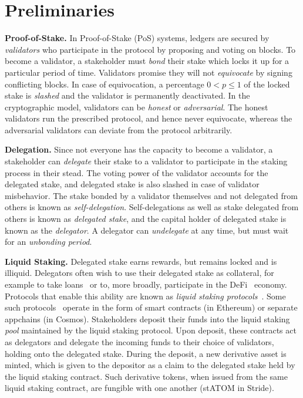 \section{Preliminaries}\label{sec:preliminaries}


\noindent
\textbf{Proof-of-Stake.} In Proof-of-Stake (PoS) systems, ledgers are secured
by \emph{validators} who participate in the protocol by proposing and voting
on blocks. To become a validator, a stakeholder must \emph{bond} their stake
which locks it up for a particular period of time. Validators promise they will
not \emph{equivocate} by signing conflicting blocks.
In case of equivocation, a percentage $0 < p \leq 1$ of the locked stake is
\emph{slashed} and the validator is permanently deactivated. In the cryptographic
model, validators can be \emph{honest} or \emph{adversarial}. The honest validators
run the prescribed protocol, and hence never equivocate, whereas the adversarial
validators can deviate from the protocol arbitrarily.


\noindent
\textbf{Delegation.} Since not everyone has the capacity to become a validator,
a stakeholder can \emph{delegate} their stake to a validator to participate in
the staking process in their stead. The voting power of the validator accounts
for the delegated stake, and delegated stake is also slashed in case of validator
misbehavior. The stake bonded by a validator themselves and not delegated from
others is known as \emph{self-delegation}. Self-delegations as
well as stake delegated from others is known as \emph{delegated stake},
and the capital holder of delegated stake is known as the \emph{delegator}.
A delegator can \emph{undelegate} at any time, but must wait for an
\emph{unbonding period}.

\noindent
\textbf{Liquid Staking.} Delegated stake earns rewards, but remains locked and
is illiquid. Delegators often wish to use their delegated stake as collateral,
for example to take loans~\cite{gudgeon2020defi} or to, more broadly, participate in the
DeFi~\cite{defi-sok} economy. Protocols that enable this ability are known as
\emph{liquid staking protocols}~\cite{liquid-staking-report}.
Some such protocols~\cite{lido,stride} operate
in the form of smart contracts (in Ethereum) or separate appchains (in Cosmos).
Stakeholders deposit their funds into the liquid staking \emph{pool} maintained
by the liquid staking protocol. Upon deposit, these contracts act as
delegators and delegate the incoming funds to their choice of validators, holding
onto the delegated stake. During the deposit, a new derivative asset is minted,
which is given to the depositor as a claim to the delegated stake held by the
liquid staking contract. Such derivative tokens, when issued from the same liquid
staking contract, are fungible with one another (\eg \textsf{stATOM} in Stride).

